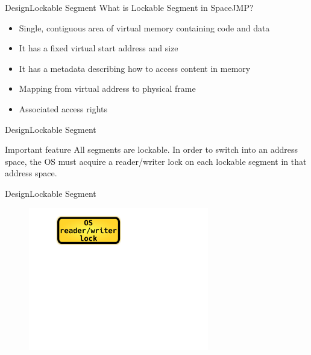 \documentclass[10pt]{beamer}
\begin{document}
\begin{frame}{Design}{Lockable Segment}
  What is Lockable Segment in SpaceJMP? \pause
  \begin{itemize}
    \item Single, contiguous area of virtual memory containing code and data \pause
    \item It has a fixed virtual start address and size \pause
    \item It has a metadata describing how to access content in memory \pause
    \item Mapping from virtual address to physical frame \pause
    \item Associated access rights
  \end{itemize}
\end{frame}

\begin{frame}{Design}{Lockable Segment}
  \begin{block}{Important feature}
    All segments are lockable. In order to switch into an address space, the OS
    must acquire a reader/writer lock on each lockable segment in that address
    space.
  \end{block}
\end{frame}

\begin{frame}{Design}{Lockable Segment}
  \begin{figure}[ht]
    \centering
    \includegraphics[width=0.7\textwidth, keepaspectratio=true]{images/lockable_segment_a.png}
  \end{figure}
\end{frame}
\end{document}
